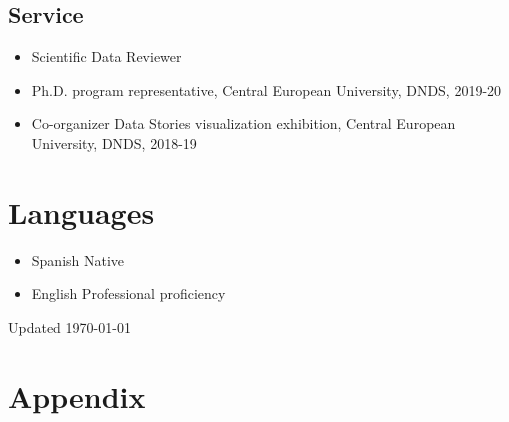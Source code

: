 \documentclass{academiccv}
\begin{document}
\subsection*{Service}
\begin{itemize}
	\item Scientific Data Reviewer
	\item Ph.D. program representative, Central European University, DNDS, 2019-20
	\item Co-organizer Data Stories visualization exhibition, Central European University, DNDS, 2018-19
\end{itemize}


\section*{Languages}
\begin{itemize}
	\item Spanish \tab Native
	\item English \tab Professional proficiency
\end{itemize}

\begin{center}
\vspace{6em}
Updated \monthyeardate\today
\end{center}

\newpage

\section*{Appendix}
\end{document}
